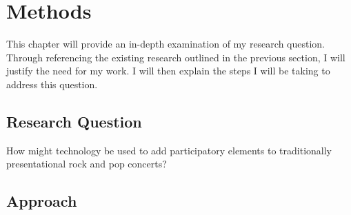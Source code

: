 \chapter{Methods}

This chapter will provide an in-depth examination of my research question. Through referencing the existing research outlined in the previous section, I will justify the need for my work. I will then explain the steps I will be taking to address this question.

\section{Research Question}

How might technology be used to add participatory elements to traditionally presentational rock and pop concerts?


\section{Approach}